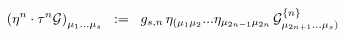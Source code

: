 \begin{equation}
{({\eta^n \cdot \tau^n {\cal{G}}})}_{\mu_1 ... \mu_s} \;\; := \;\; g_{s,n} \, \eta_{( \mu_1 \mu_2} ... \eta_{\mu_{2n-1} \mu_{2n}} \, {\cal{G}}^{\{ n \}}_{\mu_{2n+1} ... \mu_s )}
\label{eq:x14}
\end{equation}


